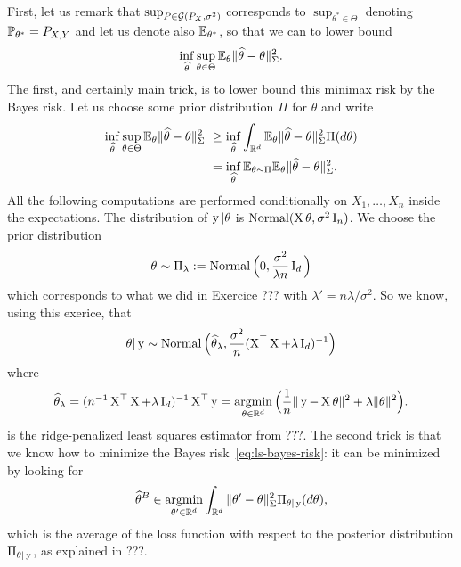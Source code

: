 First, let us remark that $\sup_{P \in \cG(P_X, \sigma^2)}$ corresponds to $\sup_{\theta^* \in \Theta}$ denoting $\P_{\theta^*} = P_{X, Y}$ and let us denote also $\E_{\theta^*}$, so that we can to lower bound
\begin{equation*}
	\inf_{\wh \theta} \sup_{\theta \in \Theta} \E_\theta \norm{\wh \theta - \theta}_{\bSigma}^2.
\end{equation*}
The first, and certainly main trick, is to lower bound this minimax risk by the Bayes risk. Let us choose some prior distribution $\Pi$ for $\theta$ and write
\begin{align}
	\nonumber
	\inf_{\wh \theta} \sup_{\theta \in \Theta} \E_\theta \norm{\wh \theta - \theta}_{\bSigma}^2 
	&\geq \inf_{\wh \theta} \int_{\R^d} \E_\theta \norm{\wh \theta - \theta}_{\bSigma}^2 \Pi(d \theta) \\
	\label{eq:ls-bayes-risk}
	&= \inf_{\wh \theta} \E_{\theta \sim \Pi} \E_\theta \norm{\wh \theta - \theta}_{\bSigma}^2.
\end{align}
All the following computations are performed conditionally on $X_1, \ldots, X_n$ inside the expectations.
The distribution of $\by | \theta$ is $\nor(\bX \theta, \sigma^2 \bI_n)$. We choose the prior distribution
\begin{equation*}
	\theta \sim \Pi_\lambda := \nor\Big( 0, \frac{\sigma^2}{\lambda n} \bI_d \Big)
\end{equation*}
which corresponds to what we did in Exercice ??? with $\lambda' = n \lambda / \sigma^2$.
So we know, using this exerice, that 
\begin{equation*}
	\theta | \by \sim \nor\Big( \wh \theta_\lambda, \frac{\sigma^2}{n} (\bX^\top \bX + \lambda \bI_d)^{-1} \Big)
\end{equation*}
where
\begin{equation*}
	\wh \theta_\lambda = (n^{-1} \bX^\top \bX + \lambda \bI_d)^{-1} \bX^\top \by = \argmin_{\theta \in \R^d} \Big( \frac 1n \norm{\by - \bX \theta}^2 + \lambda \norm{\theta}^2 \Big).
\end{equation*}
is the ridge-penalized least squares estimator from ???.
The second trick is that we know how to minimize the Bayes risk~\eqref{eq:ls-bayes-risk}: it can be minimized by looking for
\begin{equation*}
	\wh \theta^B \in \argmin_{\theta' \in \R^d} \int_{\R^d} \norm{\theta' - \theta}_{\bSigma}^2 \Pi_{\theta | \by}(d \theta),
\end{equation*}
which is the average of the loss function with respect to the posterior distribution $\Pi_{\theta | \by}$, as explained in ???.
